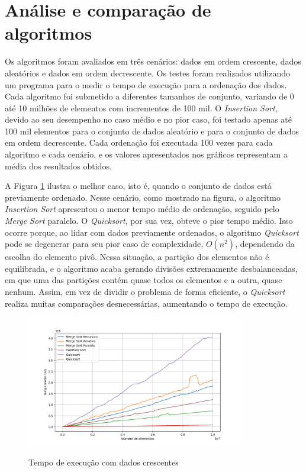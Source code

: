 \documentclass[12pt]{article}
\begin{document}
\section{Análise e comparação de algoritmos}

Os algoritmos foram avaliados em três cenários: dados em ordem crescente, dados aleatórios e dados em ordem decrescente. Os testes foram realizados utilizando um programa para o medir o tempo de execução para a ordenação dos dados. Cada algoritmo foi submetido a diferentes tamanhos de conjunto, variando de 0 até 10 milhões de elementos com incrementos de 100 mil. O \textit{Insertion Sort}, devido ao seu desempenho no caso médio e no pior caso, foi testado apenas até 100 mil elementos para o conjunto de dados aleatório e para o conjunto de dados em ordem decrescente. Cada ordenação foi executada 100 vezes para cada algoritmo e cada cenário, e os valores apresentados nos gráficos representam a média dos resultados obtidos.

A Figura \ref{fig:asc} ilustra o melhor caso, isto é, quando o conjunto de dados está previamente ordenado. Nesse cenário, como mostrado na figura, o algoritmo \textit{Insertion Sort} apresentou o menor tempo médio de ordenação, seguido pelo \textit{Merge Sort} paralelo. O \textit{Quicksort}, por sua vez, obteve o pior tempo médio. Isso ocorre porque, ao lidar com dados previamente ordenados, o algoritmo \textit{Quicksort} pode se degenerar para seu pior caso de complexidade, $O(n^2)$, dependendo da escolha do elemento pivô. Nessa situação, a partição dos elementos não é equilibrada, e o algoritmo acaba gerando divisões extremamente desbalanceadas, em que uma das partições contém quase todos os elementos e a outra, quase nenhum. Assim, em vez de dividir o problema de forma eficiente, o \textit{Quicksort} realiza muitas comparações desnecessárias, aumentando o tempo de execução.

\begin{figure}[ht]
\centering
\caption{Tempo de execução com dados crescentes}
\includegraphics[width=0.85\textwidth]{time_ascending.png}
\label{fig:asc}
\end{figure}
\end{document}
